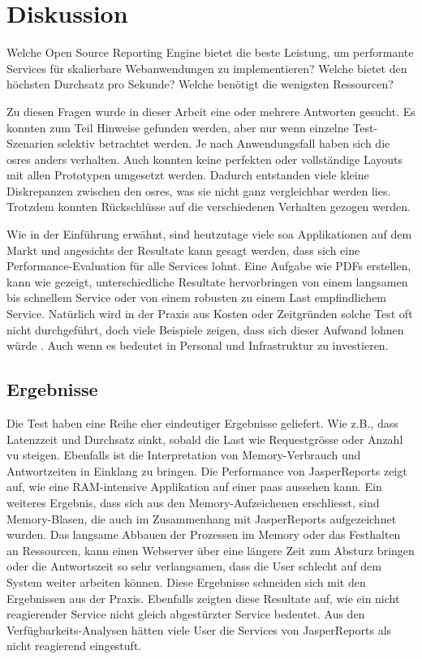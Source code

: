 \documentclass[main.tex]{subfiles}
\begin{document}
\chapter{Diskussion} 

Welche Open Source Reporting Engine bietet die beste Leistung, um performante Services für skalierbare Webanwendungen zu implementieren?
Welche bietet den höchsten Durchsatz pro Sekunde?
Welche benötigt die wenigsten Ressourcen?

Zu diesen Fragen wurde in dieser Arbeit eine oder mehrere Antworten gesucht. Es konnten zum Teil Hinweise gefunden werden, aber nur wenn einzelne Test-Szenarien selektiv betrachtet werden. Je nach Anwendungsfall haben sich die \acrshort{osre}s anders verhalten. Auch konnten keine perfekten oder vollständige Layouts mit allen Prototypen umgesetzt werden. Dadurch entstanden viele kleine Diskrepanzen zwischen den \acrshort{osre}s, was sie nicht ganz vergleichbar werden lies. Trotzdem konnten Rückschlüsse auf die verschiedenen Verhalten gezogen werden.  

Wie in der Einführung erwähnt, sind heutzutage viele \acrfull{soa} Applikationen auf dem Markt und angesichts der Resultate kann gesagt werden, dass sich eine Performance-Evaluation für alle Services lohnt. Eine Aufgabe wie PDFs erstellen, kann wie gezeigt, unterschiedliche Resultate hervorbringen von einem langsamen bis schnellem Service oder von einem robusten zu einem Last empfindlichem Service. Natürlich wird in der Praxis aus Kosten oder Zeitgründen solche Test oft nicht durchgeführt, doch viele Beispiele zeigen, dass sich dieser Aufwand lohnen würde \cite[vgl.~Kap.1]{erinle_2013}. Auch wenn es bedeutet in Personal und Infrastruktur zu investieren.   
\section{Ergebnisse}
Die Test haben eine Reihe eher eindeutiger Ergebnisse geliefert. Wie z.B., dass Latenzzeit und Durchsatz sinkt, sobald die Last wie Requestgrösse oder Anzahl \acrlong{vu} steigen. Ebenfalls ist die Interpretation von Memory-Verbrauch und Antwortzeiten in Einklang zu bringen. Die Performance von JasperReports zeigt auf, wie eine RAM-intensive Applikation auf einer \acrlong{paas} aussehen kann. Ein weiteres Ergebnis, dass sich aus den Memory-Aufzeichenen erschliesst, sind Memory-Blasen, die auch im Zusammenhang mit JasperReports aufgezeichnet wurden. Das langsame Abbauen der Prozessen im Memory oder das Festhalten an Ressourcen, kann einen Webserver über eine längere Zeit zum Absturz bringen oder die Antwortszeit so sehr verlangsamen, dass die User schlecht auf dem System weiter arbeiten können. Diese Ergebnisse schneiden sich mit den Ergebnissen aus der Praxis. Ebenfalls zeigten diese Resultate auf, wie ein nicht reagierender Service nicht gleich abgestürzter Service bedeutet. Aus den Verfügbarkeits-Analysen hätten viele User die Services von JasperReports als nicht reagierend eingestuft. 
\end{document}
